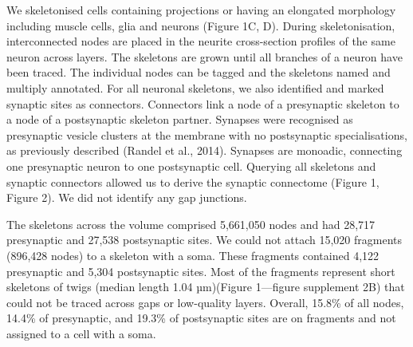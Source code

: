 \documentclass[
  11pt,
]{article}
\begin{document}
We skeletonised cells containing projections or having an elongated
morphology including muscle cells, glia and neurons (Figure 1C, D).
During skeletonisation, interconnected nodes are placed in the neurite
cross-section profiles of the same neuron across layers. The skeletons
are grown until all branches of a neuron have been traced. The
individual nodes can be tagged and the skeletons named and multiply
annotated. For all neuronal skeletons, we also identified and marked
synaptic sites as connectors. Connectors link a node of a presynaptic
skeleton to a node of a postsynaptic skeleton partner. Synapses were
recognised as presynaptic vesicle clusters at the membrane with no
postsynaptic specialisations, as previously described (Randel et al.,
2014). Synapses are monoadic, connecting one presynaptic neuron to one
postsynaptic cell. Querying all skeletons and synaptic connectors
allowed us to derive the synaptic connectome (Figure 1, Figure 2). We
did not identify any gap junctions.

The skeletons across the volume comprised 5,661,050 nodes and had 28,717
presynaptic and 27,538 postsynaptic sites. We could not attach 15,020
fragments (896,428 nodes) to a skeleton with a soma. These fragments
contained 4,122 presynaptic and 5,304 postsynaptic sites. Most of the
fragments represent short skeletons of twigs (median length 1.04
µm)(Figure 1---figure supplement 2B) that could not be traced across
gaps or low-quality layers. Overall, 15.8\% of all nodes, 14.4\% of
presynaptic, and 19.3\% of postsynaptic sites are on fragments and not
assigned to a cell with a soma.
\end{document}
